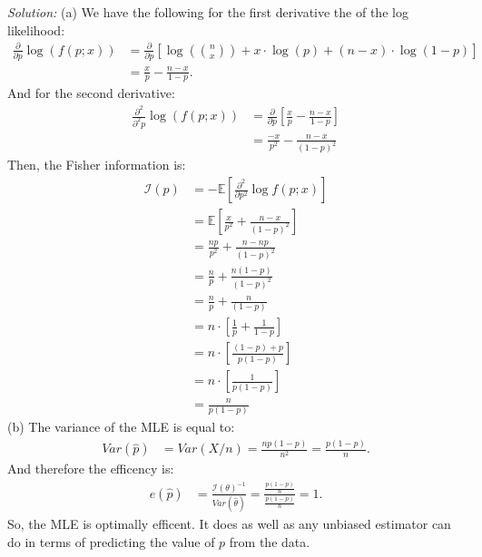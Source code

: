 \documentclass{tufte-handout}
\begin{document}
\textit{Solution:} (a) We have the following for the first derivative the of the log likelihood:
\begin{align*}
\frac{\partial}{\partial p} \log(f(p; x))
&= \frac{\partial}{\partial p} \left[ \log(\binom{n}{x}) +  x \cdot \log(p) + (n-x) \cdot \log(1-p) \right] \\
&= \frac{x}{p} - \frac{n-x}{1-p}.
\end{align*}
And for the second derivative:
\begin{align*}
\frac{\partial^2}{\partial^2 p} \log(f(p; x))
&= \frac{\partial}{\partial p} \left[ \frac{x}{p} - \frac{n-x}{1-p} \right] \\
&= \frac{-x}{p^2} - \frac{n-x}{(1-p)^2}
\end{align*}
Then, the Fisher information is:
\begin{align*}
\mathcal{I}(p) &= - \mathbb{E} \left[ \frac{\partial^2}{\partial p^2} \log f(p; x) \right] \\
&= \mathbb{E} \left[ \frac{x}{p^2} + \frac{n-x}{(1-p)^2} \right] \\
&= \frac{np}{p^2} + \frac{n-np}{(1-p)^2} \\
&= \frac{n}{p} + \frac{n(1-p)}{(1-p)^2} \\
&= \frac{n}{p} + \frac{n}{(1-p)} \\
&= n \cdot \left[ \frac{1}{p} + \frac{1}{1-p} \right] \\
&= n \cdot \left[ \frac{(1 - p) + p}{p (1 - p)} \right] \\
&= n \cdot \left[ \frac{1}{p (1 - p)} \right] \\
&= \frac{n}{p (1 - p)}
\end{align*}
(b) The variance of the MLE is equal to:
\begin{align*}
Var(\hat{p}) &= Var(X/n) = \frac{np(1-p)}{n^2} = \frac{p(1-p)}{n}.
\end{align*}
And therefore the efficency is:
\begin{align*}
e(\hat{p}) &= \frac{\mathcal{I}(\theta)^{-1}}{Var(\widehat{\theta})} = \frac{\frac{p (1 - p)}{n}}{\frac{p(1-p)}{n}} = 1.
\end{align*}
So, the MLE is optimally efficent. It does as well as any unbiased estimator can do in
terms of predicting the value of $p$ from the data.
\end{document}
